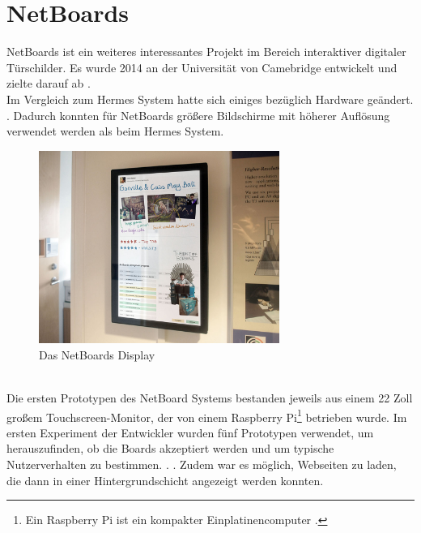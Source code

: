 \section{NetBoards}
NetBoards \cite{wood:2014,netboards:website} ist ein weiteres interessantes Projekt im Bereich interaktiver digitaler Türschilder. Es wurde 2014 an der Universität von Camebridge entwickelt und zielte darauf ab .
\\
Im Vergleich zum Hermes System hatte sich einiges bezüglich Hardware geändert. .
Dadurch konnten für NetBoards größere Bildschirme mit höherer Auflösung  verwendet werden als beim Hermes System.
\begin{figure}[h!]
  \centering
    \includegraphics[width=0.7\textwidth]{./img/netBoards_display.png}
  \caption{Das NetBoards Display \cite{wood:2014}}
  \label{img:netBoardsDisplay}
\end{figure}
\\
Die ersten Prototypen des NetBoard Systems bestanden jeweils aus einem 22 Zoll großem Touchscreen-Monitor, der von einem Raspberry Pi\footnote{Ein Raspberry Pi ist ein kompakter Einplatinencomputer \cite{raspberrypi:website}.} betrieben wurde.
Im ersten Experiment der Entwickler wurden fünf Prototypen verwendet, um herauszufinden, ob die Boards akzeptiert werden und um typische Nutzerverhalten zu bestimmen.
.
. Zudem war es möglich, Webseiten zu laden, die dann in einer Hintergrundschicht angezeigt werden konnten.
